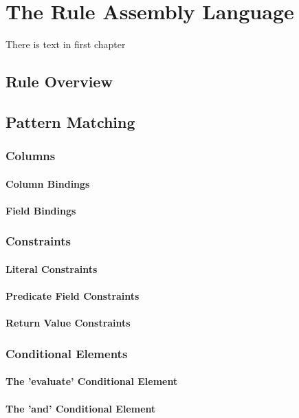 \chapter{The Rule Assembly Language}
There is text in first chapter

\section{Rule Overview}

\section{Pattern Matching}

\subsection{Columns}
\subsubsection{Column Bindings}
\subsubsection{Field Bindings}

\subsection{Constraints}
\subsubsection{Literal Constraints}
\subsubsection{Predicate Field Constraints}
\subsubsection{Return Value Constraints}

\subsection{Conditional Elements}
\subsubsection{The 'evaluate' Conditional Element}
\subsubsection{The 'and' Conditional Element}
